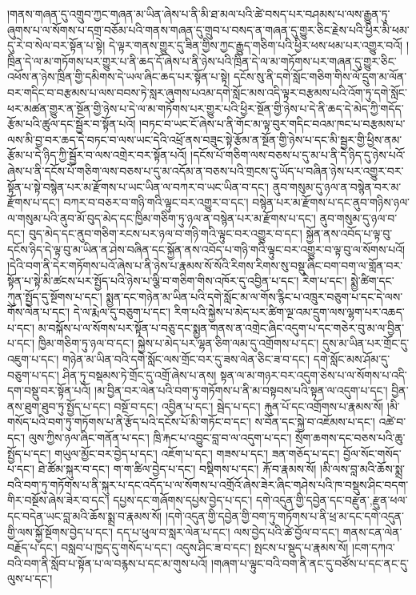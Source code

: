 །གནས་གཞན་དུ་འགྲུབ་ཀྱང་གཞན་མ་ཡིན་ཞེས་པ་ནི་མི་ཐ་མལ་པའི་ཚེ་བསད་པར་བཤམས་པ་ལས་རྒྱུན་ཏུ་ཞུགས་པ་ལ་སོགས་པ་དགྲ་བཅོམ་པའི་གནས་གཞན་དུ་གྲུབ་པ་བསད་ན་གཞན་དུ་གྱུར་ཅིང་རྗེས་པའི་ཕྱིར་མི་ཕམ་དུ་རེ་བ་སེལ་བར་སྟོན་པ་སྟེ། དེ་ལྟར་གནས་གྱུར་དུ་ཟིན་གྱིས་ཀྱང་རྒྱུད་གཅིག་པའི་ཕྱིར་ཕས་ཕམ་པར་འགྱུར་བའོ། །ཁྲིན་དེ་ལ་མ་གཏོགས་པར་གྱུར་པ་ནི་ཆད་དོ་ཞེས་པ་ནི་ཉེས་པའི་ཁྲིན་དེ་ལ་མ་གཏོགས་པར་གཞན་དུ་གྱུར་ཅིང་འཕོས་ན་ཉེས་ཁྲིན་གྱི་དམིགས་དེ་ཡལ་ཞིང་ཆད་པར་སྟོན་པ་སྟེ། དངོས་སུ་ནི་དགེ་སློང་གཅིག་གིས་ལོ་དྲུག་མ་ལོན་བར་གདིང་བ་བརྩམས་པ་ལས་བབས་ཏེ་སླར་ཞུགས་པའམ་དགེ་སློང་མས་འདི་ལྟར་བརྩམས་པའི་འོག་ཏུ་དགེ་སློང་ཕར་མཚན་གྱུར་ན་སྔོན་གྱི་ཉེས་པ་དེ་ལ་མ་གཏོགས་པར་གྱུར་པའི་ཕྱིར་སྔོན་གྱི་ཉེས་པ་དེ་ནི་ཆད་དེ་མེད་ཀྱི་གདོད་རྩོམ་པའི་ཚུལ་དང་སྦྱོར་བ་སྟོན་པའོ། །བཏང་བ་ཡང་ངོ་ཞེས་པ་ནི་གོང་མ་ལྟ་བུར་གདིང་བའམ་ཁང་པ་བརྩམས་པ་ལས་མི་བྱ་བར་ཆད་དེ་བཏང་བ་ལས་ཡང་དེའི་འཕྲོ་ནས་བཟུང་སྟེ་རྩོམ་ན་སྔོན་གྱི་ཉེས་པ་དང་མི་སྦྱར་གྱི་ཕྱིས་ནམ་རྩོམ་པ་དེ་ཉིད་ཀྱི་སྦྱོར་བ་ལས་འགྲེར་བར་སྟོན་པའོ། །དངོས་པོ་གཅིག་ལས་བཅས་པ་དུ་མ་པ་ནི་དེ་ཉིད་དུ་ཉེས་པའོ་ཞེས་པ་ནི་དངོས་པོ་གཅིག་ལས་བཅས་པ་དུ་མ་འདོམ་ན་བཅས་པའི་གྲངས་དུ་ཡོད་པ་བཞིན་ཉེས་པར་འགྱུར་བར་སྟོན་པ་སྟེ་བསྙེན་པར་མ་རྫོགས་པ་ཡང་ཡིན་ལ་བཀར་བ་ཡང་ཡིན་བ་དང་། ནུབ་གསུམ་དུ་ཉལ་ན་བསྙེན་བར་མ་རྫོགས་པ་དང་། བཀར་བ་བཅར་བ་གཉི་གའི་ལྟུང་བར་འགྱུར་བ་དང་། བསྙེན་པར་མ་རྫོགས་པ་དང་ནུབ་གཉིས་ཉལ་ལ་གསུམ་པའི་ནུབ་མོ་བུད་མེད་དང་ཁྱིམ་གཅིག་ཏུ་ཉལ་ན་བསྙེན་པར་མ་རྫོགས་པ་དང་། ནུབ་གསུམ་དུ་ཉལ་བ་དང་། བུད་མེད་དང་ནུབ་གཅིག་རངས་པར་ཉལ་བ་གཉི་གའི་ལྟུང་བར་འགྱུར་བ་དང་། སྐྱོན་ནས་འབོད་པ་ལྟ་བུ་དངོས་ཉིད་དེ་ལྟ་བུ་མ་ཡིན་ན་ཤེས་བཞིན་དང་སྐྱོན་ནས་འབོད་པ་གཉི་གའི་ལྟུང་བར་འགྱུར་བ་ལྟ་བུ་ལ་སོགས་པའོ། །དེའི་བག་ནི་དེར་གཏོགས་པའོ་ཞེས་པ་ནི་ཉེས་པ་རྣམས་སོ་སོའི་རིགས་རིགས་སུ་བསྡུ་ཞིང་བག་བག་ལ་གློན་བར་སྟོན་པ་སྟེ་མི་ཚངས་པར་སྤྱོད་པའི་ཉེས་པ་ལྕི་བ་གཅིག་གིས་འཁོར་དུ་འབྱིན་པ་དང་། རེག་པ་དང་། སྨྱེ་ཚིག་དང་ཀུན་སྤྱོད་དུ་སྔོགས་པ་དང་། སྨྱན་དང་གཉེན་མ་ཡིན་པའི་དགེ་སློང་མ་ལ་གོས་རྙིང་པ་འཁྲུར་བཅུག་པ་དང་དེ་ལས་གོས་ལེན་པ་དང་། དེ་ལ་རྨེལ་དུ་བཅུག་པ་དང་། རིག་པའི་སྐྱེས་པ་མེད་པར་ཚིག་ལྔ་འམ་དྲུག་ལས་ལྷག་པར་འཆད་པ་དང་། མ་བསྐོས་པ་ལ་སོགས་པར་སྟོན་པ་བཅུ་དང་སྨྱན་གནས་ན་འགྲེང་ཞིང་འདུག་པ་དང་གཅེར་བུ་མ་ལ་བྱིན་པ་དང་། ཁྱིམ་གཅིག་ཏུ་ཉལ་བ་དང་། སྐྱེས་པ་མེད་པར་ལྷན་ཅིག་ལམ་དུ་འགྲོགས་པ་དང་། དུས་མ་ཡིན་པར་གྲོང་དུ་འཇུག་པ་དང་། གཉེན་མ་ཡིན་བའི་དགེ་སློང་ལས་གྲོང་བར་དུ་ཟས་ལེན་ཅིང་ཟ་བ་དང་། དགེ་སློང་མས་ཤོམ་དུ་བཅུག་པ་དང་། ཤིན་ཏུ་བསྡམས་ཏེ་གྲོང་དུ་འགྲོ་ཞེས་པ་ནས། སྟན་ལ་མ་གཉར་བར་འདུག་ཅེས་པ་ལ་སོགས་པ་འདི་དག་བསྡུ་བར་སྟོན་པའོ། །མ་བྱིན་བར་ལེན་པའི་བག་ཏུ་གཏོགས་པ་ནི་མ་བསྟབས་པའི་སྟན་ལ་འདུག་པ་དང་། བྱིན་ནས་ཐུག་ཐུབ་ཏུ་སྤྱོད་པ་དང་། བསྔོ་བ་དང་། འབྱིན་པ་དང་། སྦེད་པ་དང་། རྐུན་པོ་དང་འགྲོགས་པ་རྣམས་སོ། །མི་གསོད་པའི་བག་ཏུ་གཏོགས་པ་ནི་རྩོད་པའི་དངོས་པོ་མི་གཏོང་བ་དང་། ས་བོན་དང་སྐྱེ་བ་འཇོམས་པ་དང་། འཚེ་བ་དང་། ལུས་ཀྱིས་ཉལ་ཞིང་གནོན་པ་དང་། ཁྲི་རྐང་པ་འབྱུང་བླ་བ་ལ་འདུག་པ་དང་། སྲོག་ཆགས་དང་བཅས་པའི་ཆུ་སྤྱོད་པ་དང་། གཡུལ་མྱོང་བར་བྱེད་པ་དང་། འཇོག་པ་དང་། གཟས་པ་དང་། ཟན་གཅོད་པ་དང་། བྱོལ་སོང་གསོད་པ་དང་། ཐེ་ཚོམ་སྐུར་བ་དང་། ག་ག་ཚིལ་བྱེད་པ་དང་། བསྡིགས་པ་དང་། རྐོ་བ་རྣམས་སོ། །མི་ལས་བླ་མའི་ཆོས་སྨྲ་བའི་བག་ཏུ་གཏོགས་པ་ནི་སྐུར་པ་དང་འདོད་པ་ལ་སོགས་པ་འགྲོའོ་ཞེས་ཟེར་ཞིང་གཤེས་པའི་ཁ་བསྡུས་ཤིང་བདག་གིར་བསྔོས་ཞེས་ཟེར་བ་དང་། དཔྱས་དང་གཞོགས་དཔྱས་བྱེད་པ་དང་། དགེ་འདུན་གྱི་དབྱེན་དང་{བརྫུན་,རྫུན་}ཕལ་དང་བདེན་ཡང་བླ་མའི་ཆོས་སྨྲ་བ་རྣམས་སོ། །དགེ་འདུན་གྱི་དབྱེན་གྱི་བག་ཏུ་གཏོགས་པ་ནི་ཕྲ་མ་དང་དགེ་འདུན་གྱི་ལས་སྐྱོ་སྔོགས་བྱེད་པ་དང་། དད་པ་ཕུལ་བ་སླར་ལེན་པ་དང་། ལས་བྱེད་པའི་ཚེ་བྱོལ་བ་དང་། གནས་ངན་ལེན་བརྗོད་པ་དང་། བསླབ་པ་ཁྱད་དུ་གསོད་པ་དང་། འདུས་ཤིང་ཟ་བ་དང་། སྤངས་པ་སྡུད་པ་རྣམས་སོ། །ངག་དཀའ་བའི་བག་ནི་སློབ་པ་སྟོན་པ་ལ་བརྙས་པ་དང་མ་གུས་པའོ། །གཞག་པ་ལྟུང་བའི་བག་ནི་ནང་དུ་བཙོས་པ་དང་ནང་དུ་ལུས་པ་དང་། 